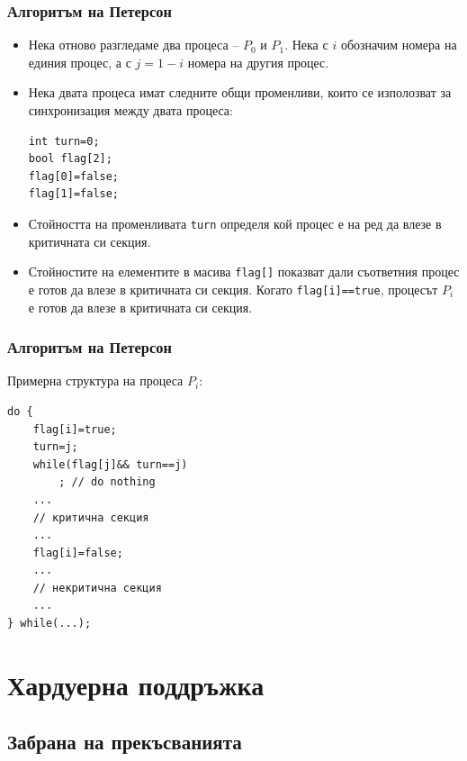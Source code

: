 \documentclass[ignorenonframetext, hyperref=unicode]{beamer}
\begin{document}
\begin{frame}[containsverbatim]
\frametitle{Алгоритъм на Петерсон}
\begin{itemize}
\item Нека отново разгледаме два процеса -- $P_0$ и $P_1$. Нека с $i$ обозначим
  номера на единия процес, а с $j=1-i$ номера на другия процес.
\item Нека двата процеса имат следните общи променливи, които се изполозват за
  синхронизация между двата процеса: 
\begin{lstlisting}[numbers=none]
int turn=0;
bool flag[2];
flag[0]=false;
flag[1]=false;
\end{lstlisting}
\item Стойността на променливата \lstinline{turn} определя кой процес е на ред
  да влезе в критичната си секция.
\item Стойностите на елементите в масива \lstinline{flag[]}  показват дали
  съответния процес е готов да влезе в критичната си секция. Когато
  \lstinline{flag[i]==true}, процесът $P_i$ е готов да влезе в критичната си секция.
\end{itemize}
\end{frame}

\begin{frame}[containsverbatim]
\frametitle{Алгоритъм на Петерсон}
Примерна структура на процеса $P_i$:
\begin{lstlisting}
do {
	flag[i]=true;
	turn=j;
	while(flag[j]&& turn==j)
		; // do nothing
	...
	// критична секция
	...
	flag[i]=false;
	...
	// некритична секция
	...
} while(...);
\end{lstlisting}
\end{frame}


\section{Хардуерна поддръжка}

\subsection{Забрана на прекъсванията}
\end{document}
